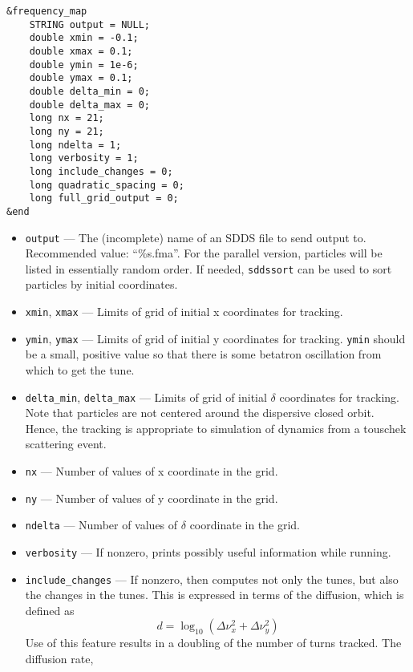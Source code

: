 \documentclass[11pt]{article}
\begin{document}
\begin{verbatim}
&frequency_map
    STRING output = NULL;
    double xmin = -0.1;
    double xmax = 0.1;
    double ymin = 1e-6;
    double ymax = 0.1;
    double delta_min = 0;
    double delta_max = 0;
    long nx = 21;
    long ny = 21;
    long ndelta = 1;
    long verbosity = 1;
    long include_changes = 0;
    long quadratic_spacing = 0;
    long full_grid_output = 0;
&end
\end{verbatim}

\begin{itemize}
\item \verb|output| --- The (incomplete) name of an SDDS file to send output to.  
 Recommended value: ``\%s.fma''.  For the parallel version, particles will be listed in essentially
 random order.  If needed, \verb|sddssort| can be used to sort particles by initial coordinates.
\item \verb|xmin|, \verb|xmax| --- Limits of grid of initial x coordinates for tracking.             
\item \verb|ymin|, \verb|ymax| --- Limits of grid of initial y coordinates for tracking.             
 \verb|ymin| should be a small, positive value so that there                               
 is some betatron oscillation from which to get the tune.                      
\item \verb|delta_min|, \verb|delta_max| --- Limits of grid of initial $\delta$ coordinates
for tracking.  Note that particles are not centered around the dispersive closed orbit.  Hence,
the tracking is appropriate to simulation of dynamics from a touschek scattering event.
\item \verb|nx| --- Number of values of x coordinate in the grid.
\item \verb|ny| --- Number of values of y coordinate in the grid.
\item \verb|ndelta| --- Number of values of $\delta$ coordinate in the grid.
\item \verb|verbosity| --- If nonzero, prints possibly useful information while running.
\item \verb|include_changes| --- If nonzero, then computes not only the tunes, but also
        the changes in the tunes.  This is expressed in terms of the diffusion, which is defined
        as 
\begin{equation}
  d = \log_{10} \left(\Delta\nu_x^2 + \Delta\nu_y^2\right)
\end{equation}
Use of this feature results in a doubling of the number of turns tracked. The diffusion rate, 

\end{itemize}
\end{document}

